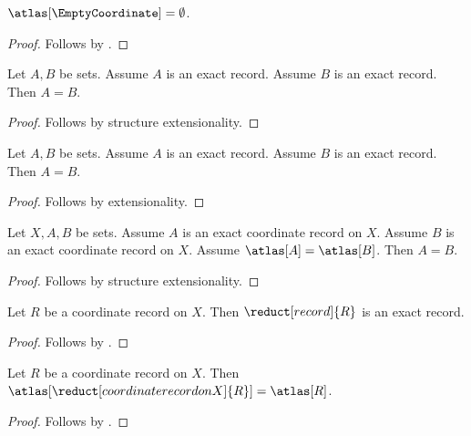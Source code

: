 \begin{proposition}\label{coordinate_projection}
    $\atlas[\EmptyCoordinate]=\emptyset$.
\end{proposition}
\begin{proof}
    Follows by .
\end{proof}

\begin{proposition}\label{empty_record_extensionality}
    Let $A,B$ be sets.
    Assume $A$ is an exact record.
    Assume $B$ is an exact record.
    Then $A=B$.
\end{proposition}
\begin{proof}
    Follows by structure extensionality.
\end{proof}

\begin{proposition}\label{empty_record_generic_extensionality}
    Let $A,B$ be sets.
    Assume $A$ is an exact record.
    Assume $B$ is an exact record.
    Then $A=B$.
\end{proposition}
\begin{proof}
    Follows by extensionality.
\end{proof}

\begin{proposition}\label{coordinate_extensionality}
    Let $X,A,B$ be sets.
    Assume $A$ is an exact coordinate record on $X$.
    Assume $B$ is an exact coordinate record on $X$.
    Assume $\atlas[A]=\atlas[B]$.
    Then $A=B$.
\end{proposition}
\begin{proof}
    Follows by structure extensionality.
\end{proof}

\begin{proposition}\label{coordinate_root_reduct}
    Let $R$ be a coordinate record on $X$.
    Then $\reduct[record]{R}$ is an exact record.
\end{proposition}
\begin{proof}
    Follows by .
\end{proof}

\begin{proposition}\label{coordinate_reduct_projection}
    Let $R$ be a coordinate record on $X$.
    Then $\atlas[\reduct[coordinate record on X]{R}]=\atlas[R]$.
\end{proposition}
\begin{proof}
    Follows by .
\end{proof}
